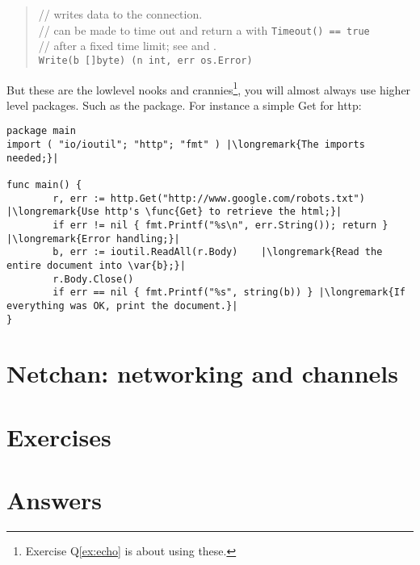 \begin{quote}
//  writes data to the connection.\\
//  can be made to time out and return a  with \lstinline{Timeout() == true}\\
// after a fixed time limit; see  and .\\
\lstinline{Write(b []byte) (n int, err os.Error)}
\end{quote}

But these are the lowlevel nooks and crannies\footnote{Exercise Q\ref{ex:echo} is about using
these.}, you will almost always use higher level packages.
Such as the  package. For instance a simple Get for http:
\begin{lstlisting}
package main
import ( "io/ioutil"; "http"; "fmt" ) |\longremark{The imports needed;}|

func main() {
        r, err := http.Get("http://www.google.com/robots.txt") |\longremark{Use http's \func{Get} to retrieve the html;}|
        if err != nil { fmt.Printf("%s\n", err.String()); return } |\longremark{Error handling;}|
        b, err := ioutil.ReadAll(r.Body)    |\longremark{Read the entire document into \var{b};}|
        r.Body.Close()  
        if err == nil { fmt.Printf("%s", string(b)) } |\longremark{If everything was OK, print the document.}|
}
\end{lstlisting}
\showremarks

\section{Netchan: networking and channels}

\section{Exercises}












\cleardoublepage
\section{Answers}
\shipoutAnswer
